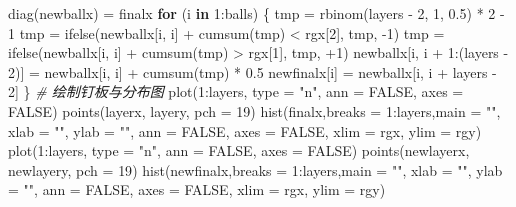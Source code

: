 \documentclass[]{tufte-book}
\newenvironment{Shaded}{}{}
\newcommand{\AttributeTok}[1]{\textcolor[rgb]{0.49,0.56,0.16}{#1}}
\newcommand{\CommentTok}[1]{\textcolor[rgb]{0.38,0.63,0.69}{\textit{#1}}}
\newcommand{\ConstantTok}[1]{\textcolor[rgb]{0.53,0.00,0.00}{#1}}
\newcommand{\ControlFlowTok}[1]{\textcolor[rgb]{0.00,0.44,0.13}{\textbf{#1}}}
\newcommand{\DecValTok}[1]{\textcolor[rgb]{0.25,0.63,0.44}{#1}}
\newcommand{\FloatTok}[1]{\textcolor[rgb]{0.25,0.63,0.44}{#1}}
\newcommand{\FunctionTok}[1]{\textcolor[rgb]{0.02,0.16,0.49}{#1}}
\newcommand{\NormalTok}[1]{#1}
\newcommand{\OtherTok}[1]{\textcolor[rgb]{0.00,0.44,0.13}{#1}}
\newcommand{\SpecialCharTok}[1]{\textcolor[rgb]{0.25,0.44,0.63}{#1}}
\newcommand{\StringTok}[1]{\textcolor[rgb]{0.25,0.44,0.63}{#1}}
\begin{document}
\begin{Shaded}
\begin{Highlighting}[]
\FunctionTok{diag}\NormalTok{(newballx) }\OtherTok{=}\NormalTok{ finalx}
\ControlFlowTok{for}\NormalTok{ (i }\ControlFlowTok{in} \DecValTok{1}\SpecialCharTok{:}\NormalTok{balls) \{}
\NormalTok{        tmp }\OtherTok{=} \FunctionTok{rbinom}\NormalTok{(layers }\SpecialCharTok{{-}} \DecValTok{2}\NormalTok{, }\DecValTok{1}\NormalTok{, }\FloatTok{0.5}\NormalTok{) }\SpecialCharTok{*} \DecValTok{2} \SpecialCharTok{{-}} \DecValTok{1}
\NormalTok{        tmp }\OtherTok{=} \FunctionTok{ifelse}\NormalTok{(newballx[i, i] }\SpecialCharTok{+} \FunctionTok{cumsum}\NormalTok{(tmp) }\SpecialCharTok{\textless{}}\NormalTok{ rgx[}\DecValTok{2}\NormalTok{], tmp, }
                     \SpecialCharTok{{-}}\DecValTok{1}\NormalTok{)}
\NormalTok{        tmp }\OtherTok{=} \FunctionTok{ifelse}\NormalTok{(newballx[i, i] }\SpecialCharTok{+} \FunctionTok{cumsum}\NormalTok{(tmp) }\SpecialCharTok{\textgreater{}}\NormalTok{ rgx[}\DecValTok{1}\NormalTok{], tmp, }
                     \SpecialCharTok{+}\DecValTok{1}\NormalTok{)}
\NormalTok{        newballx[i, i }\SpecialCharTok{+} \DecValTok{1}\SpecialCharTok{:}\NormalTok{(layers }\SpecialCharTok{{-}} \DecValTok{2}\NormalTok{)] }\OtherTok{=}\NormalTok{ newballx[i, i] }\SpecialCharTok{+} \FunctionTok{cumsum}\NormalTok{(tmp) }\SpecialCharTok{*} 
                \FloatTok{0.5}
\NormalTok{        newfinalx[i] }\OtherTok{=}\NormalTok{ newballx[i, i }\SpecialCharTok{+}\NormalTok{ layers }\SpecialCharTok{{-}} \DecValTok{2}\NormalTok{]}
\NormalTok{\}}
\CommentTok{\# 绘制钉板与分布图}
\FunctionTok{plot}\NormalTok{(}\DecValTok{1}\SpecialCharTok{:}\NormalTok{layers, }\AttributeTok{type =} \StringTok{"n"}\NormalTok{, }\AttributeTok{ann =} \ConstantTok{FALSE}\NormalTok{, }\AttributeTok{axes =} \ConstantTok{FALSE}\NormalTok{)}
\FunctionTok{points}\NormalTok{(layerx, layery, }\AttributeTok{pch =} \DecValTok{19}\NormalTok{)}
\FunctionTok{hist}\NormalTok{(finalx,}\AttributeTok{breaks =} \DecValTok{1}\SpecialCharTok{:}\NormalTok{layers,}\AttributeTok{main =} \StringTok{""}\NormalTok{, }\AttributeTok{xlab =} \StringTok{""}\NormalTok{, }\AttributeTok{ylab =} \StringTok{""}\NormalTok{, }\AttributeTok{ann =} \ConstantTok{FALSE}\NormalTok{, }\AttributeTok{axes =} \ConstantTok{FALSE}\NormalTok{, }\AttributeTok{xlim =}\NormalTok{ rgx, }\AttributeTok{ylim =}\NormalTok{ rgy)}
\FunctionTok{plot}\NormalTok{(}\DecValTok{1}\SpecialCharTok{:}\NormalTok{layers, }\AttributeTok{type =} \StringTok{"n"}\NormalTok{, }\AttributeTok{ann =} \ConstantTok{FALSE}\NormalTok{, }\AttributeTok{axes =} \ConstantTok{FALSE}\NormalTok{)}
\FunctionTok{points}\NormalTok{(newlayerx, newlayery, }\AttributeTok{pch =} \DecValTok{19}\NormalTok{)}
\FunctionTok{hist}\NormalTok{(newfinalx,}\AttributeTok{breaks =} \DecValTok{1}\SpecialCharTok{:}\NormalTok{layers,}\AttributeTok{main =} \StringTok{""}\NormalTok{, }\AttributeTok{xlab =} \StringTok{""}\NormalTok{, }\AttributeTok{ylab =} \StringTok{""}\NormalTok{, }\AttributeTok{ann =} \ConstantTok{FALSE}\NormalTok{, }\AttributeTok{axes =} \ConstantTok{FALSE}\NormalTok{, }\AttributeTok{xlim =}\NormalTok{ rgx, }\AttributeTok{ylim =}\NormalTok{ rgy)}
\end{Highlighting}
\end{Shaded}
\end{document}
